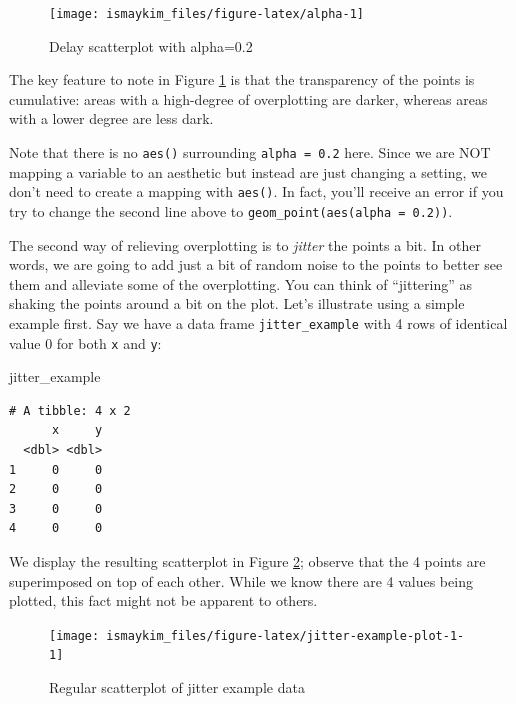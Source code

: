 \documentclass[12pt,]{krantz}
\makeatletter
\newenvironment{Shaded}{\begin{snugshade}}{\end{snugshade}}
\newcommand{\NormalTok}[1]{#1}
\newenvironment{kframe}{%
\medskip{}
\setlength{\fboxsep}{.8em}
 \def\at@end@of@kframe{}%
 \ifinner\ifhmode%
  \def\at@end@of@kframe{\end{minipage}}%
  \begin{minipage}{\columnwidth}%
 \fi\fi%
 \def\FrameCommand##1{\hskip\@totalleftmargin \hskip-\fboxsep
 \colorbox{shadecolor}{##1}\hskip-\fboxsep
     \hskip-\linewidth \hskip-\@totalleftmargin \hskip\columnwidth}%
 \MakeFramed {\advance\hsize-\width
   \@totalleftmargin\z@ \linewidth\hsize
   \@setminipage}}%
 {\par\unskip\endMakeFramed%
 \at@end@of@kframe}
\renewenvironment{Shaded}{\begin{kframe}}{\end{kframe}}
\theoremstyle{definition}
\theoremstyle{definition}
\theoremstyle{definition}
\theoremstyle{remark}
\makeatother
\begin{document}
\begin{figure}

{\centering \texttt{[image: ismaykim\_files/figure-latex/alpha-1]} 

}

\caption{Delay scatterplot with alpha=0.2}\label{fig:alpha}
\end{figure}

The key feature to note in Figure \ref{fig:alpha} is that the
transparency of the points is cumulative: areas with a high-degree of
overplotting are darker, whereas areas with a lower degree are less
dark.

Note that there is no \texttt{aes()} surrounding \texttt{alpha\ =\ 0.2}
here. Since we are NOT mapping a variable to an aesthetic but instead
are just changing a setting, we don't need to create a mapping with
\texttt{aes()}. In fact, you'll receive an error if you try to change
the second line above to \texttt{geom\_point(aes(alpha\ =\ 0.2))}.

The second way of relieving overplotting is to \emph{jitter} the points
a bit. In other words, we are going to add just a bit of random noise to
the points to better see them and alleviate some of the overplotting.
You can think of ``jittering'' as shaking the points around a bit on the
plot. Let's illustrate using a simple example first. Say we have a data
frame \texttt{jitter\_example} with 4 rows of identical value 0 for both
\texttt{x} and \texttt{y}:

\begin{Shaded}
\begin{Highlighting}[]
\NormalTok{jitter_example}
\end{Highlighting}
\end{Shaded}

\begin{verbatim}
# A tibble: 4 x 2
      x     y
  <dbl> <dbl>
1     0     0
2     0     0
3     0     0
4     0     0
\end{verbatim}

We display the resulting scatterplot in Figure
\ref{fig:jitter-example-plot-1}; observe that the 4 points are
superimposed on top of each other. While we know there are 4 values
being plotted, this fact might not be apparent to others.

\begin{figure}

{\centering \texttt{[image: ismaykim\_files/figure-latex/jitter-example-plot-1-1]} 

}

\caption{Regular scatterplot of jitter example data}\label{fig:jitter-example-plot-1}
\end{figure}
\end{document}
